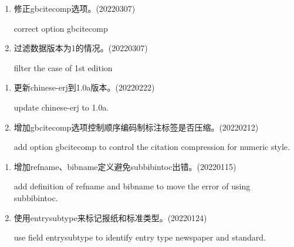 \label{up:20220307}
\begin{enumerate}

\item 修正gbcitecomp选项。(20220307)

correct option gbcitecomp

\item 过滤数据版本为1的情况。(20220307)

filter the case of 1st edition

\end{enumerate}


\label{up:20220222}
\begin{enumerate}

\item 更新chinese-erj到1.0a版本。(20220222)

update chinese-erj to 1.0a.

\item 增加gbcitecomp选项控制顺序编码制标注标签是否压缩。(20220212)

add option gbcitecomp to control the citation compression for numeric style.

\end{enumerate}



\label{up:20220124}
\begin{enumerate}

\item 增加refname、bibname定义避免subbibintoc出错。(20220115)

add definition of refname and bibname to move the error of using subbibintoc.

\item 使用entrysubtype来标记报纸和标准类型。(20220124)

use field entrysubtype to identify entry type newspaper and standard.

\end{enumerate}


\label{up:20211211}

